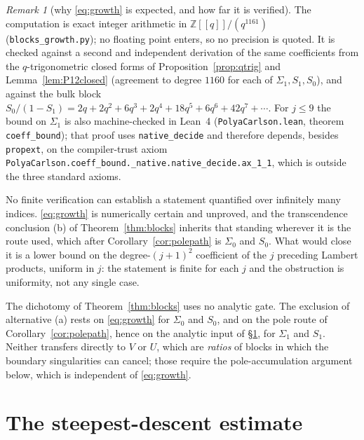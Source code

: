 \documentclass[11pt]{article}
\theoremstyle{plain}
\theoremstyle{definition}
\theoremstyle{remark}
\newtheorem{remark}[theorem]{Remark}
\newcommand{\Z}{\mathbb{Z}}
\begin{document}
\begin{remark}[why \eqref{eq:growth} is expected, and how far it is verified]
The computation is exact integer arithmetic in $\Z[[q]]/(q^{1161})$
(\texttt{blocks\_growth.py}); no floating point enters, so no precision is quoted. It is checked
against a second and independent derivation of the same coefficients from the $q$-trigonometric
closed forms of Proposition~\ref{prop:qtrig} and Lemma~\ref{lem:P12closed} (agreement to degree
$1160$ for each of $\Sigma_1,S_1,S_0$), and against the bulk block
$S_0/(1-S_1)=2q+2q^2+6q^3+2q^4+18q^5+6q^6+42q^7+\cdots$. For $j\le9$ the bound on $\Sigma_1$ is
also machine-checked in Lean~4 (\texttt{PolyaCarlson.lean}, theorem \texttt{coeff\_bound}); that
proof uses \texttt{native\_decide} and therefore depends, besides \texttt{propext}, on the
compiler-trust axiom \texttt{PolyaCarlson.coeff\_bound.\_native.native\_decide.ax\_1\_1}, which is
outside the three standard axioms.

No finite verification can establish a statement quantified over infinitely many indices.
\eqref{eq:growth} is numerically certain and unproved, and the transcendence conclusion
\textup{(b)} of Theorem~\ref{thm:blocks} inherits that standing wherever it is the route used,
which after Corollary~\ref{cor:polepath} is $\Sigma_0$ and $S_0$. What would close it is a lower
bound on the degree-$(j+1)^2$ coefficient of the $j$ preceding Lambert products, uniform in $j$:
the statement is finite for each $j$ and the obstruction is uniformity, not any single case.
\end{remark}

The dichotomy of Theorem~\ref{thm:blocks} uses no analytic gate. The exclusion of alternative
\textup{(a)} rests on \eqref{eq:growth} for $\Sigma_0$ and $S_0$, and on the pole route of
Corollary~\ref{cor:polepath}, hence on the analytic input of \S\ref{sec:sd}, for $\Sigma_1$ and
$S_1$. Neither transfers directly
to $V$ or $U$, which are \emph{ratios} of blocks in which the boundary singularities can cancel;
those require the pole-accumulation argument below, which is independent of \eqref{eq:growth}.

\section{The steepest-descent estimate}\label{sec:sd}
\end{document}
